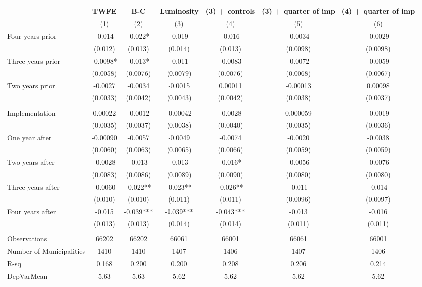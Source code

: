 \begin{tabular}{lcccccc}
\toprule
      & TWFE  & B-C   & Luminosity & (3) + controls & (3) + quarter of imp & (4) + quarter of imp \\
\midrule
      & (1)   & (2)   & (3)   & (4)   & (5)   & (6) \\
\midrule
\midrule
Four years prior & -0.014 & -0.022* & -0.019 & -0.016 & -0.0034 & -0.0029 \\
      & (0.012) & (0.013) & (0.014) & (0.013) & (0.0098) & (0.0098) \\
Three years prior & -0.0098* & -0.013* & -0.011 & -0.0083 & -0.0072 & -0.0059 \\
      & (0.0058) & (0.0076) & (0.0079) & (0.0076) & (0.0068) & (0.0067) \\
Two years prior & -0.0027 & -0.0034 & -0.0015 & 0.00011 & -0.00013 & 0.00098 \\
      & (0.0033) & (0.0042) & (0.0043) & (0.0042) & (0.0038) & (0.0037) \\
      &       &       &       &       &       &  \\
Implementation & 0.00022 & -0.0012 & -0.00042 & -0.0028 & 0.000059 & -0.0019 \\
      & (0.0035) & (0.0037) & (0.0038) & (0.0040) & (0.0035) & (0.0036) \\
One year after & -0.00090 & -0.0057 & -0.0049 & -0.0074 & -0.0020 & -0.0038 \\
      & (0.0060) & (0.0063) & (0.0065) & (0.0066) & (0.0059) & (0.0059) \\
Two years after & -0.0028 & -0.013 & -0.013 & -0.016* & -0.0056 & -0.0076 \\
      & (0.0083) & (0.0086) & (0.0089) & (0.0090) & (0.0080) & (0.0080) \\
Three years after & -0.0060 & -0.022** & -0.023** & -0.026** & -0.011 & -0.014 \\
      & (0.010) & (0.010) & (0.011) & (0.011) & (0.0096) & (0.0097) \\
Four years after & -0.015 & -0.039*** & -0.039*** & -0.043*** & -0.013 & -0.016 \\
      & (0.013) & (0.013) & (0.014) & (0.014) & (0.011) & (0.011) \\
      &       &       &       &       &       &  \\
\midrule
Observations & 66202 & 66202 & 66061 & 66001 & 66061 & 66001 \\
Number of Municipalities & 1410  & 1410  & 1407  & 1406  & 1407  & 1406 \\
R-sq  & 0.168 & 0.200 & 0.200 & 0.208 & 0.206 & 0.214 \\
DepVarMean & 5.63  & 5.63  & 5.62  & 5.62  & 5.62  & 5.62 \\
\bottomrule
\bottomrule
\end{tabular}%
